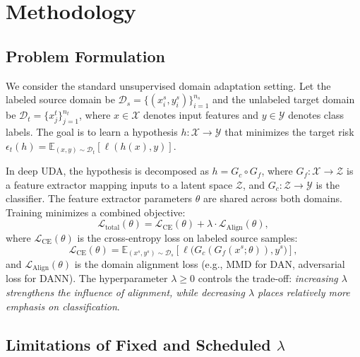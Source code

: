 \documentclass[pdflatex,sn-mathphys-num]{sn-jnl}
\theoremstyle{thmstyleone}
\theoremstyle{thmstyletwo}
\theoremstyle{thmstylethree}
\begin{document}
\section{Methodology}
\label{sec:method}

\subsection{Problem Formulation}

We consider the standard unsupervised domain adaptation setting. Let the labeled source domain be $\mathcal{D}_s = \{(x_i^s, y_i^s)\}_{i=1}^{n_s}$ and the unlabeled target domain be $\mathcal{D}_t = \{x_j^t\}_{j=1}^{n_t}$, where $x \in \mathcal{X}$ denotes input features and $y \in \mathcal{Y}$ denotes class labels. The goal is to learn a hypothesis $h: \mathcal{X} \to \mathcal{Y}$ that minimizes the target risk $\epsilon_t(h) = \mathbb{E}_{(x,y) \sim \mathcal{D}_t}[\ell(h(x), y)]$.

In deep UDA, the hypothesis is decomposed as $h = G_c \circ G_f$, where $G_f: \mathcal{X} \to \mathcal{Z}$ is a feature extractor mapping inputs to a latent space $\mathcal{Z}$, and $G_c: \mathcal{Z} \to \mathcal{Y}$ is the classifier. The feature extractor parameters $\theta$ are shared across both domains. Training minimizes a combined objective:
\begin{equation}
\mathcal{L}_{\text{total}}(\theta) = \mathcal{L}_{\text{CE}}(\theta) + \lambda \cdot \mathcal{L}_{\text{Align}}(\theta),
\label{eq:total_loss}
\end{equation}
where $\mathcal{L}_{\text{CE}}(\theta)$ is the cross-entropy loss on labeled source samples:
\begin{equation}
\mathcal{L}_{\text{CE}}(\theta) = \mathbb{E}_{(x^s, y^s) \sim \mathcal{D}_s}\left[ \ell\big(G_c(G_f(x^s; \theta)), y^s\big) \right],
\label{eq:ce_loss}
\end{equation}
and $\mathcal{L}_{\text{Align}}(\theta)$ is the domain alignment loss (e.g., MMD for DAN, adversarial loss for DANN). The hyperparameter $\lambda \geq 0$ controls the trade-off: \emph{increasing $\lambda$ strengthens the influence of alignment, while decreasing $\lambda$ places relatively more emphasis on classification}.

\subsection{Limitations of Fixed and Scheduled \texorpdfstring{$\lambda$}{lambda}}
\end{document}
